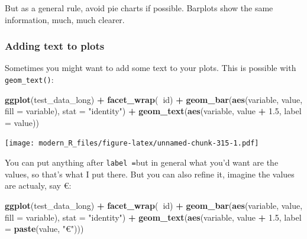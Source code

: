 \documentclass[]{gitbook}
\newenvironment{Shaded}{\begin{snugshade}}{\end{snugshade}}
\newcommand{\DataTypeTok}[1]{\textcolor[rgb]{0.13,0.29,0.53}{#1}}
\newcommand{\FloatTok}[1]{\textcolor[rgb]{0.00,0.00,0.81}{#1}}
\newcommand{\KeywordTok}[1]{\textcolor[rgb]{0.13,0.29,0.53}{\textbf{#1}}}
\newcommand{\NormalTok}[1]{#1}
\newcommand{\OperatorTok}[1]{\textcolor[rgb]{0.81,0.36,0.00}{\textbf{#1}}}
\newcommand{\StringTok}[1]{\textcolor[rgb]{0.31,0.60,0.02}{#1}}
\theoremstyle{definition}
\theoremstyle{definition}
\theoremstyle{definition}
\theoremstyle{remark}
\begin{document}
But as a general rule, avoid pie charts if possible. Barplots show the
same information, much, much clearer.

\hypertarget{adding-text-to-plots}{%
\subsubsection{Adding text to plots}\label{adding-text-to-plots}}

Sometimes you might want to add some text to your plots. This is
possible with \texttt{geom\_text()}:

\begin{Shaded}
\begin{Highlighting}[]
\KeywordTok{ggplot}\NormalTok{(test_data_long) }\OperatorTok{+}
\StringTok{  }\KeywordTok{facet_wrap}\NormalTok{(}\OperatorTok{~}\NormalTok{id) }\OperatorTok{+}
\StringTok{  }\KeywordTok{geom_bar}\NormalTok{(}\KeywordTok{aes}\NormalTok{(variable, value, }\DataTypeTok{fill =}\NormalTok{ variable), }\DataTypeTok{stat =} \StringTok{"identity"}\NormalTok{) }\OperatorTok{+}
\StringTok{  }\KeywordTok{geom_text}\NormalTok{(}\KeywordTok{aes}\NormalTok{(variable, value }\OperatorTok{+}\StringTok{ }\FloatTok{1.5}\NormalTok{, }\DataTypeTok{label =}\NormalTok{ value))}
\end{Highlighting}
\end{Shaded}

\texttt{[image: modern\_R\_files/figure-latex/unnamed-chunk-315-1.pdf]}

You can put anything after \texttt{label\ =}but in general what you'd
want are the values, so that's what I put there. But you can also refine
it, imagine the values are actualy, say €:

\begin{Shaded}
\begin{Highlighting}[]
\KeywordTok{ggplot}\NormalTok{(test_data_long) }\OperatorTok{+}
\StringTok{  }\KeywordTok{facet_wrap}\NormalTok{(}\OperatorTok{~}\NormalTok{id) }\OperatorTok{+}
\StringTok{  }\KeywordTok{geom_bar}\NormalTok{(}\KeywordTok{aes}\NormalTok{(variable, value, }\DataTypeTok{fill =}\NormalTok{ variable), }\DataTypeTok{stat =} \StringTok{"identity"}\NormalTok{) }\OperatorTok{+}
\StringTok{  }\KeywordTok{geom_text}\NormalTok{(}\KeywordTok{aes}\NormalTok{(variable, value }\OperatorTok{+}\StringTok{ }\FloatTok{1.5}\NormalTok{, }\DataTypeTok{label =} \KeywordTok{paste}\NormalTok{(value, }\StringTok{"€"}\NormalTok{)))}
\end{Highlighting}
\end{Shaded}
\end{document}
